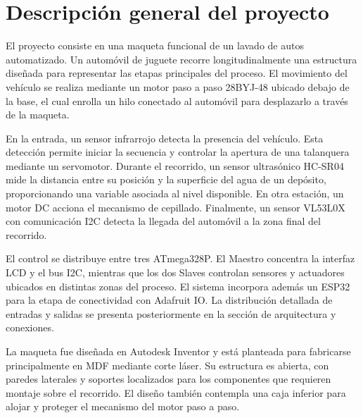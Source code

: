 \section{Descripción general del proyecto}

El proyecto consiste en una maqueta funcional de un lavado de autos automatizado. Un automóvil de juguete recorre longitudinalmente una estructura diseñada para representar las etapas principales del proceso. El movimiento del vehículo se realiza mediante un motor paso a paso 28BYJ-48 ubicado debajo de la base, el cual enrolla un hilo conectado al automóvil para desplazarlo a través de la maqueta.

En la entrada, un sensor infrarrojo detecta la presencia del vehículo. Esta detección permite iniciar la secuencia y controlar la apertura de una talanquera mediante un servomotor. Durante el recorrido, un sensor ultrasónico HC-SR04 mide la distancia entre su posición y la superficie del agua de un depósito, proporcionando una variable asociada al nivel disponible. En otra estación, un motor DC acciona el mecanismo de cepillado. Finalmente, un sensor VL53L0X con comunicación I2C detecta la llegada del automóvil a la zona final del recorrido.

El control se distribuye entre tres ATmega328P. El Maestro concentra la interfaz LCD y el bus I2C, mientras que los dos Slaves controlan sensores y actuadores ubicados en distintas zonas del proceso. El sistema incorpora además un ESP32 para la etapa de conectividad con Adafruit IO. La distribución detallada de entradas y salidas se presenta posteriormente en la sección de arquitectura y conexiones.

La maqueta fue diseñada en Autodesk Inventor y está planteada para fabricarse principalmente en MDF mediante corte láser. Su estructura es abierta, con paredes laterales y soportes localizados para los componentes que requieren montaje sobre el recorrido. El diseño también contempla una caja inferior para alojar y proteger el mecanismo del motor paso a paso.
